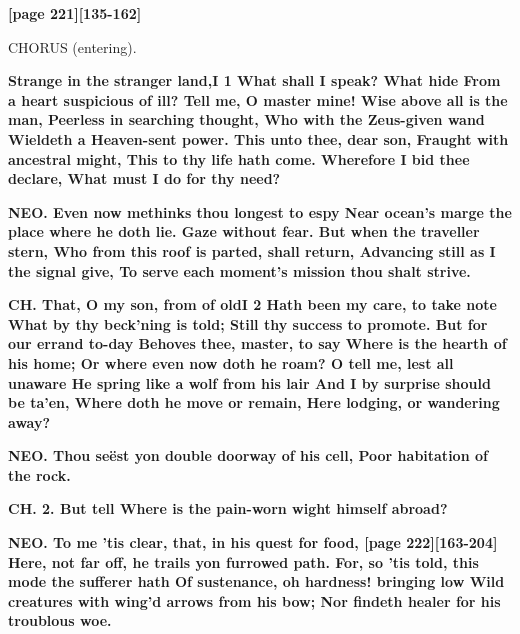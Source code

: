 \documentclass[11pt,letter]{book}
\begin{document}
\par \textbf{[page 221][135-162]}
\par 

\par  CHORUS (entering).

\par \textbf{Strange in the stranger land,I 1 What shall I speak? What hide From a heart suspicious of ill? Tell me, O master mine! Wise above all is the man, Peerless in searching thought, Who with the Zeus-given wand Wieldeth a Heaven-sent power. This unto thee, dear son, Fraught with ancestral might, This to thy life hath come. Wherefore I bid thee declare, What must I do for thy need?}
\par 

\par \textbf{NEO. Even now methinks thou longest to espy Near ocean’s marge the place where he doth lie. Gaze without fear. But when the traveller stern, Who from this roof is parted, shall return, Advancing still as I the signal give, To serve each moment’s mission thou shalt strive.}
\par 

\par \textbf{CH. That, O my son, from of oldI 2 Hath been my care, to take note What by thy beck’ning is told; Still thy success to promote. But for our errand to-day Behoves thee, master, to say Where is the hearth of his home; Or where even now doth he roam? O tell me, lest all unaware He spring like a wolf from his lair And I by surprise should be ta’en, Where doth he move or remain, Here lodging, or wandering away?}
\par 

\par \textbf{NEO. Thou seëst yon double doorway of his cell, Poor habitation of the rock.}
\par 

\par \textbf{CH. 2. But tell Where is the pain-worn wight himself abroad?}
\par 

\par \textbf{NEO. To me ’tis clear, that, in his quest for food, [page 222][163-204] Here, not far off, he trails yon furrowed path. For, so ’tis told, this mode the sufferer hath Of sustenance, oh hardness! bringing low Wild creatures with wing’d arrows from his bow; Nor findeth healer for his troublous woe.}
\par 
\end{document}
